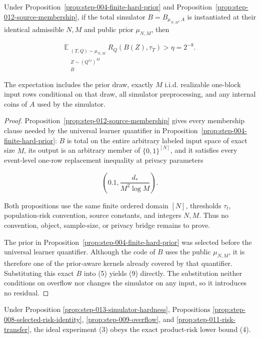 \begin{proposition}\label{prop:step-013-simulator-hardness}
Under Proposition~\ref{prop:step-004-finite-hard-prior} and
Proposition~\ref{prop:step-012-source-membership}, if the total
simulator \(B=B_{\mu_{N,M},A}\) is instantiated at their identical
admissible \(N,M\) and public prior \(\mu_{N,M}\), then

\[
\mathbb E_{\substack{(T,Q)\sim\mu_{N,M}\\
                      Z\sim(Q^{\tau_T})^M\\ B}}
R_Q(B(Z),\tau_T)>\eta=2^{-8}.
\tag{9}
\]

The expectation includes the prior draw, exactly \(M\) i.i.d. realizable
one-block input rows conditional on that draw, all simulator preprocessing,
and any internal coins of \(A\) used by the simulator.
\end{proposition}

\begin{proof}
Proposition~\ref{prop:step-012-source-membership} gives every
membership clause needed by the universal learner quantifier in Proposition~\ref{prop:step-004-finite-hard-prior}: \(B\) is total on the
entire arbitrary labeled input space of exact size \(M\), its output is an
arbitrary member of \(\{0,1\}^{[N]}\), and it satisfies every event-level
one-row replacement inequality at privacy parameters

\[
\left(0.1,\frac{d_*}{M^2\log M}\right).
\tag{10}
\]

Both propositions use the same finite ordered domain \([N]\),
thresholds \(\tau_t\), population-risk convention, source constants, and
integers \(N,M\). Thus no convention, object, sample-size, or privacy bridge
remains to prove.

The prior in Proposition~\ref{prop:step-004-finite-hard-prior} was selected
before the universal learner
quantifier. Although the code of \(B\) uses the public
\(\mu_{N,M}\), it is therefore one of the prior-aware kernels already
covered by that quantifier. Substituting this exact \(B\) into (5) yields
(9) directly. The substitution neither conditions on overflow nor changes
the simulator on any input, so it introduces no residual. \end{proof}

\begin{proposition}\label{prop:step-013-product-lower-bound}
Under Proposition \ref{prop:step-013-simulator-hardness}, Propositions
\ref{prop:step-008-selected-risk-identity},
\ref{prop:step-009-overflow}, and
\ref{prop:step-011-risk-transfer}, the ideal experiment (3) obeys the exact
product-risk lower bound (4).
\end{proposition}

